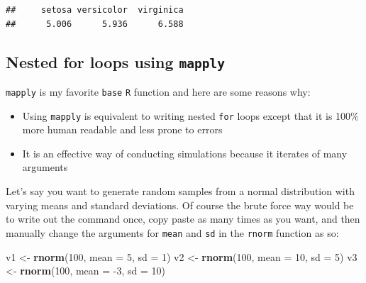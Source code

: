 \documentclass[]{book}
\makeatletter
\newenvironment{Shaded}{\begin{snugshade}}{\end{snugshade}}
\newcommand{\KeywordTok}[1]{\textcolor[rgb]{0.13,0.29,0.53}{\textbf{#1}}}
\newcommand{\DataTypeTok}[1]{\textcolor[rgb]{0.13,0.29,0.53}{#1}}
\newcommand{\DecValTok}[1]{\textcolor[rgb]{0.00,0.00,0.81}{#1}}
\newcommand{\StringTok}[1]{\textcolor[rgb]{0.31,0.60,0.02}{#1}}
\newcommand{\CommentTok}[1]{\textcolor[rgb]{0.56,0.35,0.01}{\textit{#1}}}
\newcommand{\OperatorTok}[1]{\textcolor[rgb]{0.81,0.36,0.00}{\textbf{#1}}}
\newcommand{\NormalTok}[1]{#1}
\providecommand{\tightlist}{%
  \setlength{\itemsep}{0pt}\setlength{\parskip}{0pt}}
\providecommand{\tightlist}{%
  \setlength{\itemsep}{0pt}\setlength{\parskip}{0pt}}
\newenvironment{kframe}{%
\medskip{}
\setlength{\fboxsep}{.8em}
 \def\at@end@of@kframe{}%
 \ifinner\ifhmode%
  \def\at@end@of@kframe{\end{minipage}}%
  \begin{minipage}{\columnwidth}%
 \fi\fi%
 \def\FrameCommand##1{\hskip\@totalleftmargin \hskip-\fboxsep
 \colorbox{shadecolor}{##1}\hskip-\fboxsep
     \hskip-\linewidth \hskip-\@totalleftmargin \hskip\columnwidth}%
 \MakeFramed {\advance\hsize-\width
   \@totalleftmargin\z@ \linewidth\hsize
   \@setminipage}}%
 {\par\unskip\endMakeFramed%
 \at@end@of@kframe}
\renewenvironment{Shaded}{\begin{kframe}}{\end{kframe}}
\theoremstyle{definition}
\theoremstyle{definition}
\theoremstyle{definition}
\theoremstyle{remark}
\makeatother
\begin{document}
\begin{Shaded}
\end{Shaded}

\begin{verbatim}
##     setosa versicolor  virginica 
##      5.006      5.936      6.588
\end{verbatim}

\subsection{\texorpdfstring{Nested for loops using
\texttt{mapply}}{Nested for loops using mapply}}\label{nested-for-loops-using-mapply}

\texttt{mapply} is my favorite \texttt{base} \texttt{R} function and
here are some reasons why:

\begin{itemize}
\tightlist
\item
  Using \texttt{mapply} is equivalent to writing nested \texttt{for}
  loops except that it is 100\% more human readable and less prone to
  errors
\item
  It is an effective way of conducting simulations because it iterates
  of many arguments
\end{itemize}

Let's say you want to generate random samples from a normal distribution
with varying means and standard deviations. Of course the brute force
way would be to write out the command once, copy paste as many times as
you want, and then manually change the arguments for \texttt{mean} and
\texttt{sd} in the \texttt{rnorm} function as so:

\begin{Shaded}
\begin{Highlighting}[]
\NormalTok{v1 <-}\StringTok{ }\KeywordTok{rnorm}\NormalTok{(}\DecValTok{100}\NormalTok{, }\DataTypeTok{mean =} \DecValTok{5}\NormalTok{, }\DataTypeTok{sd =} \DecValTok{1}\NormalTok{)}
\NormalTok{v2 <-}\StringTok{ }\KeywordTok{rnorm}\NormalTok{(}\DecValTok{100}\NormalTok{, }\DataTypeTok{mean =} \DecValTok{10}\NormalTok{, }\DataTypeTok{sd =} \DecValTok{5}\NormalTok{)}
\NormalTok{v3 <-}\StringTok{ }\KeywordTok{rnorm}\NormalTok{(}\DecValTok{100}\NormalTok{, }\DataTypeTok{mean =} \DecValTok{-3}\NormalTok{, }\DataTypeTok{sd =} \DecValTok{10}\NormalTok{)}
\end{Highlighting}
\end{Shaded}
\end{document}
